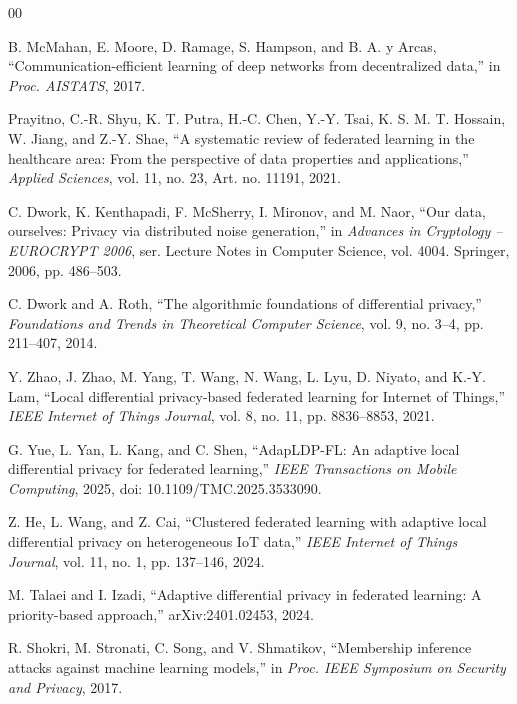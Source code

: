 \documentclass[conference]{IEEEtran}
\begin{document}
\begin{thebibliography}{00}

B. McMahan, E. Moore, D. Ramage, S. Hampson, and B. A. y Arcas,
``Communication-efficient learning of deep networks from decentralized data,''
in \textit{Proc. AISTATS}, 2017.

Prayitno, C.-R. Shyu, K. T. Putra, H.-C. Chen, Y.-Y. Tsai, K. S. M. T. Hossain,
W. Jiang, and Z.-Y. Shae, ``A systematic review of federated learning in the
healthcare area: From the perspective of data properties and applications,''
\textit{Applied Sciences}, vol. 11, no. 23, Art. no. 11191, 2021.

C. Dwork, K. Kenthapadi, F. McSherry, I. Mironov, and M. Naor, ``Our data,
ourselves: Privacy via distributed noise generation,'' in \textit{Advances in
Cryptology -- EUROCRYPT 2006}, ser. Lecture Notes in Computer Science, vol.
4004. Springer, 2006, pp. 486--503.

C. Dwork and A. Roth, ``The algorithmic foundations of differential privacy,''
\textit{Foundations and Trends in Theoretical Computer Science}, vol. 9, no.
3--4, pp. 211--407, 2014.

Y. Zhao, J. Zhao, M. Yang, T. Wang, N. Wang, L. Lyu, D. Niyato, and K.-Y. Lam,
``Local differential privacy-based federated learning for Internet of Things,''
\textit{IEEE Internet of Things Journal}, vol. 8, no. 11, pp. 8836--8853, 2021.

G. Yue, L. Yan, L. Kang, and C. Shen, ``AdapLDP-FL: An adaptive local
differential privacy for federated learning,'' \textit{IEEE Transactions on
Mobile Computing}, 2025, doi: 10.1109/TMC.2025.3533090.

Z. He, L. Wang, and Z. Cai, ``Clustered federated learning with adaptive local
differential privacy on heterogeneous IoT data,'' \textit{IEEE Internet of
Things Journal}, vol. 11, no. 1, pp. 137--146, 2024.

M. Talaei and I. Izadi, ``Adaptive differential privacy in federated learning: A
priority-based approach,'' arXiv:2401.02453, 2024.

R. Shokri, M. Stronati, C. Song, and V. Shmatikov, ``Membership inference
attacks against machine learning models,'' in \textit{Proc. IEEE Symposium on
Security and Privacy}, 2017.


\end{thebibliography}
\end{document}
